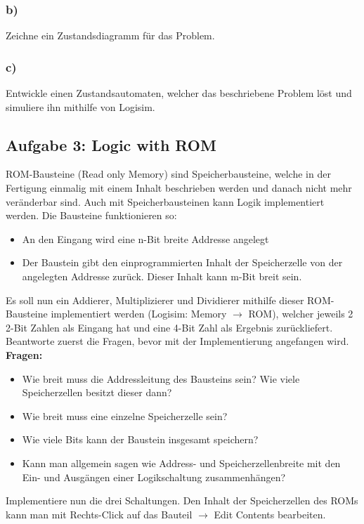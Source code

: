 \documentclass[a4paper]{scrartcl}
\begin{document}
\subsubsection*{b)}
Zeichne ein Zustandsdiagramm für das Problem.

\subsubsection*{c)}
Entwickle einen Zustandsautomaten, welcher das beschriebene Problem
 löst und simuliere ihn mithilfe von Logisim.

\subsection*{Aufgabe 3: Logic with ROM}
ROM-Bausteine (Read only Memory) sind Speicherbausteine, welche in der Fertigung einmalig mit einem Inhalt beschrieben werden und danach nicht mehr veränderbar sind.
Auch mit Speicherbausteinen kann Logik implementiert werden. Die Bausteine funktionieren so:
\begin{itemize}
  \item An den Eingang wird eine n-Bit breite Addresse angelegt
  \item Der Baustein gibt den einprogrammierten Inhalt der Speicherzelle von der angelegten Addresse zurück. Dieser Inhalt kann m-Bit breit sein.
\end{itemize}

Es soll nun ein Addierer, Multiplizierer und Dividierer mithilfe dieser ROM-Bausteine implementiert werden (Logisim: Memory $\rightarrow$ ROM), welcher
jeweils 2 2-Bit Zahlen als Eingang hat und eine 4-Bit Zahl als Ergebnis zurückliefert. Beantworte zuerst die Fragen, bevor mit der 
Implementierung angefangen wird.\\

\textbf{Fragen:}
\begin{itemize}
  \item Wie breit muss die Addressleitung des Bausteins sein? Wie viele Speicherzellen besitzt dieser dann?
  \item Wie breit muss eine einzelne Speicherzelle sein?
  \item Wie viele Bits kann der Baustein insgesamt speichern?
  \item Kann man allgemein sagen wie Address- und Speicherzellenbreite mit den Ein- und Ausgängen einer Logikschaltung zusammenhängen?
\end{itemize}

Implementiere nun die drei Schaltungen. Den Inhalt der Speicherzellen
des ROMs kann man mit Rechts-Click auf das Bauteil $\rightarrow$ Edit Contents bearbeiten.\\
\end{document}
